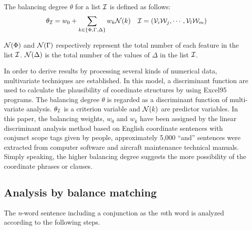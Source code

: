 The balancing degree $\theta$ for a list ${\cal I}$ is defined as
follows:
\begin{eqnarray*}
\theta_{\cal I} =  {w}_{0} + \sum_{k \in \{\Phi,\Gamma,\Delta\}} {w}_{k}{\cal N}(k)
& &
{\cal I} =  ({\cal V}_{i}{\cal W}_{j},\cdots,{\cal V}_{l}{\cal W}_{m})
\end{eqnarray*}

${\cal N}(\Phi)$ and ${\cal N}(\Gamma)$ respectively represent the
total number of each feature in the list ${\cal I}$.  ${\cal
N}(\Delta)$ is the total number of the values of $\Delta$ in the list
${\cal I}$.

In order to derive results by processing several kinds of numerical
data, multivariate techniques are established\cite{MVA}. In
this model, a discriminant function are used to calculate the
plausibility of coordinate structures by using
Excel95 programs\cite{ExcelMVA}.  The balancing degree
$\theta$ is regarded as a discriminant function of multi-variate
analysis. $\theta_{\cal I}$ is a criterion variable and ${\cal N}(k)$
are predictor variables. In this paper, the balancing weights,
${w}_{0}$ and ${w}_{k}$ have been assigned by the linear discriminant
analysis method based on English coordinate sentences with conjunct
scope tags given by people, approximately 5,000 ``and'' sentences were
extracted from computer software and aircraft maintenance technical
manuals.  Simply speaking, the higher balancing degree suggests the
more possibility of the coordinate phrases or clauses.

\subsection{Analysis by balance matching}

The {\sl n}-word sentence including a conjunction as the {\sl m}th
word is analyzed according to the following steps.

